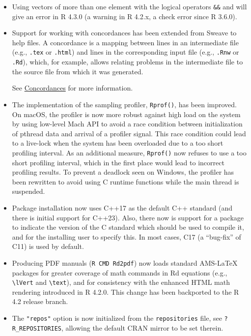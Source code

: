 \begin{itemize}
\item
  Using vectors of more than one element with the logical operators \texttt{\&\&}
  and \texttt{\textbar{}\textbar{}} will give an error in R 4.3.0 (a warning in R 4.2.x, a check
  error since R 3.6.0).
\item
  Support for working with concordances has been extended from
  Sweave to help files. A concordance is a mapping between lines in an
  intermediate file (e.g., \texttt{.tex} or \texttt{.html}) and lines in the
  corresponding input file (e.g., \texttt{.Rnw} or \texttt{.Rd}), which, for example, allows
  relating problems in the intermediate file to the source file from which
  it was generated.

  See \href{https://blog.r-project.org/2022/10/20/concordances}{Concordances} for more
  information.
\item
  The implementation of the sampling profiler, \texttt{Rprof()}, has been
  improved. On macOS, the profiler is now more robust against high load on
  the system by using low-level Mach API to avoid a race condition between
  initialization of pthread data and arrival of a profiler signal. This
  race condition could lead to a live-lock when the system has been
  overloaded due to a too short profiling interval. As an additional
  measure, \texttt{Rprof()} now refuses to use a too short profiling interval,
  which in the first place would lead to incorrect profiling results. To
  prevent a deadlock seen on Windows, the profiler has been rewritten to
  avoid using C runtime functions while the main thread is suspended.
\item
  Package installation now uses C++17 as the default C++ standard (and
  there is initial support for C++23). Also, there now is support for
  a package to indicate the version of the C standard which should be
  used to compile it, and for the installing user to specify this. In
  most cases, C17 (a ``bug-fix'' of C11) is used by default.
\item
  Producing PDF manuals (\texttt{R\ CMD\ Rd2pdf}) now loads standard AMS-LaTeX
  packages for greater coverage of math commands in Rd equations
  (e.g., \texttt{\textbackslash{}lVert} and \texttt{\textbackslash{}text}), and for consistency with the
  enhanced HTML math rendering introduced in R 4.2.0. This change has been
  backported to the R 4.2 release branch.
\item
  The \texttt{"repos"} option is now initialized from the \texttt{repositories} file,
  see \texttt{?R\_REPOSITORIES}, allowing the default CRAN mirror to be set therein.
\end{itemize}

